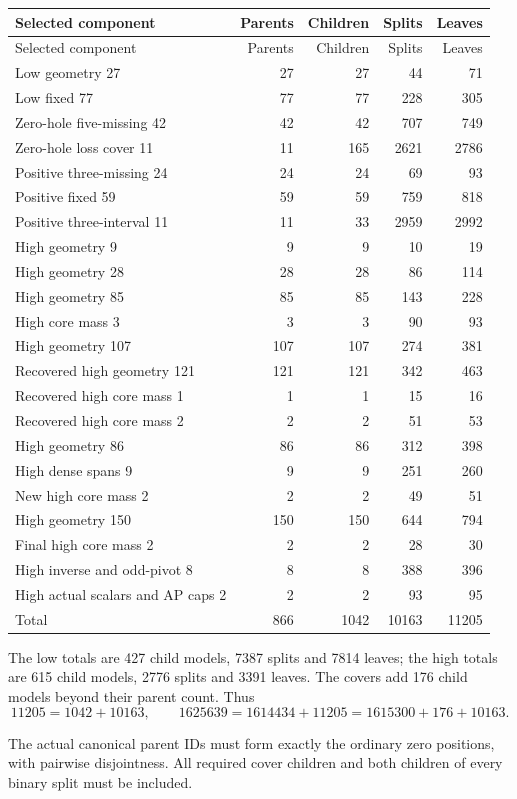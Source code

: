 \documentclass[11pt,a4paper]{article}
\theoremstyle{remark}
\begin{document}
\begin{center}\small
\begin{longtable}{p{.43\linewidth}rrrr}
\toprule
Selected component&Parents&Children&Splits&Leaves\\\midrule
\endfirsthead
\toprule
Selected component&Parents&Children&Splits&Leaves\\\midrule
\endhead
Low geometry 27&27&27&44&71\\
Low fixed 77&77&77&228&305\\
Zero-hole five-missing 42&42&42&707&749\\
Zero-hole loss cover 11&11&165&2621&2786\\
Positive three-missing 24&24&24&69&93\\
Positive fixed 59&59&59&759&818\\
Positive three-interval 11&11&33&2959&2992\\
High geometry 9&9&9&10&19\\
High geometry 28&28&28&86&114\\
High geometry 85&85&85&143&228\\
High core mass 3&3&3&90&93\\
High geometry 107&107&107&274&381\\
Recovered high geometry 121&121&121&342&463\\
Recovered high core mass 1&1&1&15&16\\
Recovered high core mass 2&2&2&51&53\\
High geometry 86&86&86&312&398\\
High dense spans 9&9&9&251&260\\
New high core mass 2&2&2&49&51\\
High geometry 150&150&150&644&794\\
Final high core mass 2&2&2&28&30\\
High inverse and odd-pivot 8&8&8&388&396\\
High actual scalars and AP caps 2&2&2&93&95\\\midrule
Total&866&1042&10163&11205\\\bottomrule
\end{longtable}
\end{center}
The low totals are 427 child models, 7387 splits and 7814 leaves;
the high totals are 615 child models, 2776 splits and 3391 leaves.
The covers add 176 child models beyond their parent count. Thus
\[
 11205=1042+10163,\qquad
 1625639=1614434+11205=1615300+176+10163.
\]

The actual canonical parent IDs must form exactly the ordinary zero
positions, with pairwise disjointness. All required cover children and
both children of every binary split must be included.
\end{document}
